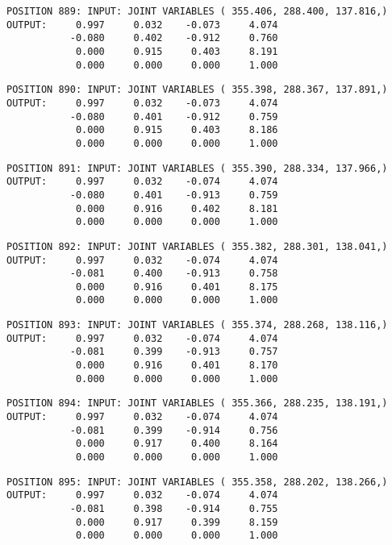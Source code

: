 \begin{verbatim}
POSITION 889: INPUT: JOINT VARIABLES ( 355.406, 288.400, 137.816,)
OUTPUT:     0.997     0.032    -0.073     4.074
           -0.080     0.402    -0.912     0.760
            0.000     0.915     0.403     8.191
            0.000     0.000     0.000     1.000
\end{verbatim} \pagebreak[1]\begin{verbatim}
POSITION 890: INPUT: JOINT VARIABLES ( 355.398, 288.367, 137.891,)
OUTPUT:     0.997     0.032    -0.073     4.074
           -0.080     0.401    -0.912     0.759
            0.000     0.915     0.403     8.186
            0.000     0.000     0.000     1.000
\end{verbatim} \pagebreak[1]\begin{verbatim}
POSITION 891: INPUT: JOINT VARIABLES ( 355.390, 288.334, 137.966,)
OUTPUT:     0.997     0.032    -0.074     4.074
           -0.080     0.401    -0.913     0.759
            0.000     0.916     0.402     8.181
            0.000     0.000     0.000     1.000
\end{verbatim} \pagebreak[1]\begin{verbatim}
POSITION 892: INPUT: JOINT VARIABLES ( 355.382, 288.301, 138.041,)
OUTPUT:     0.997     0.032    -0.074     4.074
           -0.081     0.400    -0.913     0.758
            0.000     0.916     0.401     8.175
            0.000     0.000     0.000     1.000
\end{verbatim} \pagebreak[1]\begin{verbatim}
POSITION 893: INPUT: JOINT VARIABLES ( 355.374, 288.268, 138.116,)
OUTPUT:     0.997     0.032    -0.074     4.074
           -0.081     0.399    -0.913     0.757
            0.000     0.916     0.401     8.170
            0.000     0.000     0.000     1.000
\end{verbatim} \pagebreak[1]\begin{verbatim}
POSITION 894: INPUT: JOINT VARIABLES ( 355.366, 288.235, 138.191,)
OUTPUT:     0.997     0.032    -0.074     4.074
           -0.081     0.399    -0.914     0.756
            0.000     0.917     0.400     8.164
            0.000     0.000     0.000     1.000
\end{verbatim} \pagebreak[1]\begin{verbatim}
POSITION 895: INPUT: JOINT VARIABLES ( 355.358, 288.202, 138.266,)
OUTPUT:     0.997     0.032    -0.074     4.074
           -0.081     0.398    -0.914     0.755
            0.000     0.917     0.399     8.159
            0.000     0.000     0.000     1.000
\end{verbatim} \pagebreak[1]\begin{verbatim}

\end{verbatim}
